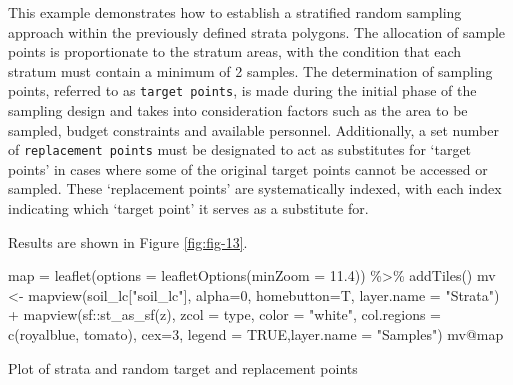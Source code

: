 \documentclass[
  10pt,
  b5paper,
  oneside]{book}
\newenvironment{Shaded}{\begin{snugshade}}{\end{snugshade}}
\newcommand{\AttributeTok}[1]{\textcolor[rgb]{0.77,0.63,0.00}{#1}}
\newcommand{\ConstantTok}[1]{\textcolor[rgb]{0.00,0.00,0.00}{#1}}
\newcommand{\DecValTok}[1]{\textcolor[rgb]{0.00,0.00,0.81}{#1}}
\newcommand{\FloatTok}[1]{\textcolor[rgb]{0.00,0.00,0.81}{#1}}
\newcommand{\FunctionTok}[1]{\textcolor[rgb]{0.00,0.00,0.00}{#1}}
\newcommand{\NormalTok}[1]{#1}
\newcommand{\OtherTok}[1]{\textcolor[rgb]{0.56,0.35,0.01}{#1}}
\newcommand{\SpecialCharTok}[1]{\textcolor[rgb]{0.00,0.00,0.00}{#1}}
\newcommand{\StringTok}[1]{\textcolor[rgb]{0.31,0.60,0.02}{#1}}
\begin{document}
This example demonstrates how to establish a stratified random sampling approach within the previously defined strata polygons. The allocation of sample points is proportionate to the stratum areas, with the condition that each stratum must contain a minimum of 2 samples. The determination of sampling points, referred to as \texttt{\textquotesingle{}target\ points\textquotesingle{}}, is made during the initial phase of the sampling design and takes into consideration factors such as the area to be sampled, budget constraints and available personnel. Additionally, a set number of \texttt{\textquotesingle{}replacement\ points\textquotesingle{}} must be designated to act as substitutes for `target points' in cases where some of the original target points cannot be accessed or sampled. These `replacement points' are systematically indexed, with each index indicating which `target point' it serves as a substitute for.

Results are shown in Figure \ref{fig:fig-13}.

\begin{Shaded}
\begin{Highlighting}[]
\NormalTok{  map }\OtherTok{=} \FunctionTok{leaflet}\NormalTok{(}\AttributeTok{options =} \FunctionTok{leafletOptions}\NormalTok{(}\AttributeTok{minZoom =} \FloatTok{11.4}\NormalTok{)) }\SpecialCharTok{\%\textgreater{}\%}
        \FunctionTok{addTiles}\NormalTok{()}
\NormalTok{  mv }\OtherTok{\textless{}{-}} \FunctionTok{mapview}\NormalTok{(soil\_lc[}\StringTok{"soil\_lc"}\NormalTok{], }\AttributeTok{alpha=}\DecValTok{0}\NormalTok{, }\AttributeTok{homebutton=}\NormalTok{T, }\AttributeTok{layer.name =} \StringTok{"Strata"}\NormalTok{) }\SpecialCharTok{+} 
        \FunctionTok{mapview}\NormalTok{(sf}\SpecialCharTok{::}\FunctionTok{st\_as\_sf}\NormalTok{(z), }\AttributeTok{zcol =} \StringTok{\textquotesingle{}type\textquotesingle{}}\NormalTok{, }\AttributeTok{color =} \StringTok{"white"}\NormalTok{, }\AttributeTok{col.regions =} \FunctionTok{c}\NormalTok{(}\StringTok{\textquotesingle{}royalblue\textquotesingle{}}\NormalTok{, }\StringTok{\textquotesingle{}tomato\textquotesingle{}}\NormalTok{), }\AttributeTok{cex=}\DecValTok{3}\NormalTok{, }\AttributeTok{legend =} \ConstantTok{TRUE}\NormalTok{,}\AttributeTok{layer.name =} \StringTok{"Samples"}\NormalTok{)}
\NormalTok{  mv}\SpecialCharTok{@}\NormalTok{map}
\end{Highlighting}
\end{Shaded}

\label{fig:fig-13}Plot of strata and random target and replacement points
\end{document}
